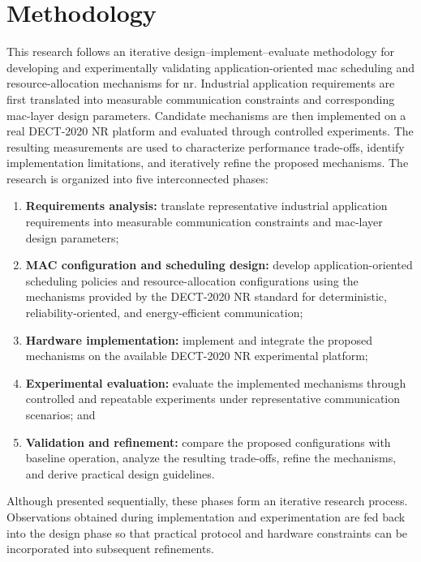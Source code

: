 \documentclass[12pt,a4paper]{article}
\begin{document}
\section{Methodology}
\label{sec:methodology}

This research follows an iterative design--implement--evaluate methodology for
developing and experimentally validating application-oriented \gls{mac}
scheduling and resource-allocation mechanisms for \gls{nr}. Industrial
application requirements are first translated into measurable communication
constraints and corresponding \gls{mac}-layer design parameters. Candidate
mechanisms are then implemented on a real DECT-2020 NR platform and evaluated
through controlled experiments. The resulting measurements are used to
characterize performance trade-offs, identify implementation limitations, and
iteratively refine the proposed mechanisms.
The research is organized into five interconnected phases:

\begin{enumerate}

\item \textbf{Requirements analysis:}
translate representative industrial application requirements into measurable
communication constraints and \gls{mac}-layer design parameters;

\item \textbf{MAC configuration and scheduling design:}
develop application-oriented scheduling policies and resource-allocation
configurations using the mechanisms provided by the DECT-2020 NR standard
for deterministic, reliability-oriented, and energy-efficient communication;

\item \textbf{Hardware implementation:}
implement and integrate the proposed mechanisms on the available DECT-2020 NR
experimental platform;

\item \textbf{Experimental evaluation:}
evaluate the implemented mechanisms through controlled and repeatable
experiments under representative communication scenarios; and

\item \textbf{Validation and refinement:}
compare the proposed configurations with baseline operation, analyze the
resulting trade-offs, refine the mechanisms, and derive practical design
guidelines.

\end{enumerate}

Although presented sequentially, these phases form an iterative research
process. Observations obtained during implementation and experimentation are
fed back into the design phase so that practical protocol and hardware
constraints can be incorporated into subsequent refinements.
\end{document}
